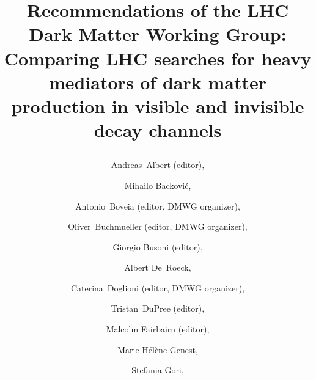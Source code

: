 \documentclass[review]{elsarticle}
\begin{document}
\title{\begin{boldmath} \huge Recommendations of the LHC Dark Matter Working Group: Comparing LHC searches for heavy mediators of dark matter production in visible and invisible decay channels\vspace{7mm} \end{boldmath}}



\author[1]{Andreas~Albert (editor),}
\address[1]{III. Physikalisches Institut A, RWTH Aachen University, Aachen, Germany}

\author[2]{Mihailo Backovi\'c,}
\address[2]{Center for Cosmology, Particle Physics and Phenomenology - CP3, Universite Catholique de Louvain, Louvain-la-neuve, Belgium}

\author[3]{Antonio~Boveia (editor, DMWG organizer),}
\address[3]{Ohio State University, 191 W. Woodruff Avenue
Columbus, OH 43210}

\author[4]{Oliver~Buchmueller (editor, DMWG organizer),}
\address[4]{High Energy Physics Group, Blackett Laboratory, Imperial College, Prince Consort Road, London, SW7 2AZ, United Kingdom}

\author[5]{Giorgio Busoni (editor),} 
\address[5]{ARC Centre of Excellence for Particle Physics at the Terascale, School of Physics, University of Melbourne, 3010, Australia}

\author[6,7]{Albert De~Roeck,}
\address[6]{Antwerp University, BÐ2610 Wilrijk, Belgium. }
\address[7]{CERN, EP Department, CH-1211 Geneva 23, Switzerland}

\author[8]{Caterina~Doglioni (editor, DMWG organizer),}
\address[8]{Fysiska institutionen, Lunds universitet, Lund, Sweden}

\author[9]{Tristan~DuPree (editor),}
\address[9]{Nikhef, Science Park 105, NL-1098 XG Amsterdam, The Netherlands}


\author[10]{Malcolm Fairbairn (editor),}
\address[10]{Physics, King's College London, Strand, London, WC2R 2LS, UK}

\author[11]{Marie-H\'{e}l\`{e}ne Genest,}
\address[11]{Laboratoire de Physique Subatomique et de Cosmologie, Universit\'{e} Grenoble-Alpes, CNRS/IN2P3, 53 rue des Martyrs, 38026 Grenoble Cedex, France}

\author[12]{Stefania Gori,}
\address[12]{Department of Physics, University of Cincinnati, Cincinnati, Ohio 45221, USA}
\end{document}
